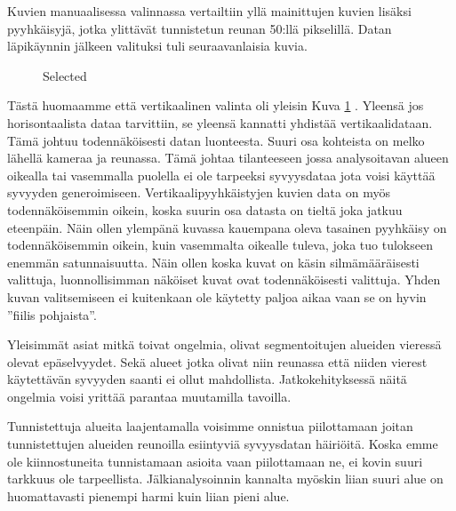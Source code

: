 Kuvien manuaalisessa valinnassa vertailtiin yllä mainittujen kuvien lisäksi pyyhkäisyjä,
jotka ylittävät tunnistetun reunan 50:llä pikselillä.
Datan läpikäynnin jälkeen valituksi tuli seuraavanlaisia kuvia.

\begin{figure}[h]
\centering
{}
\caption{Selected}
\label{fig:selected}
\end{figure}

Tästä huomaamme että vertikaalinen valinta oli yleisin Kuva \ref{fig:selected} .
Yleensä jos horisontaalista dataa tarvittiin, se yleensä kannatti yhdistää vertikaalidataan.
Tämä johtuu todennäköisesti datan luonteesta. Suuri osa kohteista on melko lähellä kameraa ja reunassa.
Tämä johtaa tilanteeseen jossa analysoitavan alueen oikealla tai vasemmalla puolella ei ole tarpeeksi syvyysdataa jota voisi käyttää syvyyden generoimiseen.
Vertikaalipyyhkäistyjen kuvien data on myös todennäköisemmin oikein, koska suurin osa datasta on tieltä joka jatkuu eteenpäin.
Näin ollen ylempänä kuvassa kauempana oleva tasainen pyyhkäisy on todennäköisemmin oikein, kuin vasemmalta oikealle tuleva, joka tuo tulokseen enemmän satunnaisuutta.
Näin ollen koska kuvat on käsin silmämääräisesti valittuja, luonnollisimman näköiset kuvat ovat todennäköisesti valittuja.
Yhden kuvan valitsemiseen ei kuitenkaan ole käytetty paljoa aikaa vaan se on hyvin ”fiilis pohjaista”.

Yleisimmät asiat mitkä toivat ongelmia, olivat segmentoitujen alueiden vieressä olevat epäselvyydet.
Sekä alueet jotka olivat niin reunassa että niiden vierest käytettävän syvyyden saanti ei ollut mahdollista.
Jatkokehityksessä näitä ongelmia voisi yrittää parantaa muutamilla tavoilla. 

Tunnistettuja alueita laajentamalla voisimme onnistua piilottamaan joitan tunnistettujen alueiden reunoilla esiintyviä syvyysdatan häiriöitä.
Koska emme ole kiinnostuneita tunnistamaan asioita vaan piilottamaan ne, ei kovin suuri tarkkuus ole tarpeellista.
Jälkianalysoinnin kannalta myöskin liian suuri alue on huomattavasti pienempi harmi kuin liian pieni alue.


